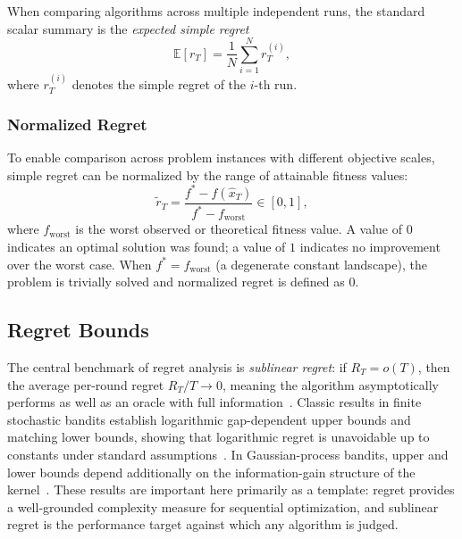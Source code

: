 When comparing algorithms across multiple independent runs, the
standard scalar summary
is the \textit{expected simple regret}
\[
  \mathbb{E}[r_T] = \frac{1}{N}\sum_{i=1}^{N} r_T^{(i)},
\]
where $r_T^{(i)}$ denotes the simple regret of the $i$-th run.

\subsubsection{Normalized Regret}
To enable comparison across problem instances with different
objective scales, simple
regret can be normalized by the range of attainable fitness values:
\[
  \tilde{r}_T = \frac{f^{*} - f(\hat{x}_T)}{f^{*} -
  f_{\mathrm{worst}}} \in [0, 1],
\]
where $f_{\mathrm{worst}}$ is the worst observed or theoretical
fitness value. A value of
$0$ indicates an optimal solution was found; a value of $1$ indicates
no improvement over
the worst case. When $f^{*} = f_{\mathrm{worst}}$ (a degenerate
constant landscape), the
problem is trivially solved and normalized regret is defined as $0$.

\subsection{Regret Bounds}

The central benchmark of regret analysis is \textit{sublinear regret}: if
$R_T = o(T)$, then the average per-round regret $R_T/T \to 0$, meaning the
algorithm asymptotically performs as well as an oracle with full
information~\cite{cesa2006prediction,bubeck2012regret,lattimore2020bandit}.
Classic results in finite stochastic bandits establish logarithmic gap-dependent
upper bounds and matching lower bounds, showing that logarithmic regret is
unavoidable up to constants under standard
assumptions~\cite{auer2002finite,lai1985adaptive}. In Gaussian-process bandits,
upper and lower bounds depend additionally on the information-gain structure of
the kernel~\cite{srinivas2009gaussian,scarlett2017lower}. These results are
important here primarily as a template: regret provides a well-grounded
complexity measure for sequential optimization, and sublinear regret is the
performance target against which any algorithm is judged.

